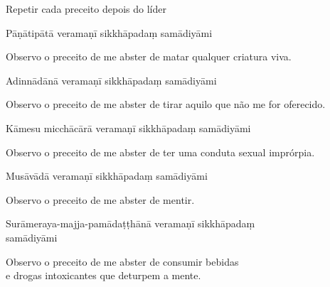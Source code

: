 {\begin{instruction}
  Repetir cada preceito depois do líder
\end{instruction}

\begin{precept}
  \setcounter{enumi}{0}
  \item Pāṇātipātā veramaṇī sikkhāpadaṃ samādiyāmi
\end{precept}

\begin{english}
  Observo o preceito de me abster de matar qualquer criatura viva.
\end{english}

\begin{precept}
  \setcounter{enumi}{1}
  \item Adinnādānā veramaṇī sikkhāpadaṃ samādiyāmi
\end{precept}

\begin{english}
  Observo o preceito de me abster de tirar aquilo que não me for oferecido.
\end{english}

\begin{precept}
  \setcounter{enumi}{2}
  \item Kāmesu micchācārā veramaṇī sikkhāpadaṃ samādiyāmi
\end{precept}

\begin{english}
  Observo o preceito de me abster de ter uma conduta sexual imprórpia.
\end{english}

\begin{precept}
  \setcounter{enumi}{3}
  \item Musāvādā veramaṇī sikkhāpadaṃ samādiyāmi
\end{precept}

\begin{english}
  Observo o preceito de me abster de mentir.
\end{english}

\begin{precept}
  \setcounter{enumi}{4}
  \item Surāmeraya-majja-pamādaṭṭhānā veramaṇī sikkhāpadaṃ\\ samādiyāmi
\end{precept}

\begin{english}
  Observo o preceito de me abster de consumir bebidas\\
  e drogas intoxicantes que deturpem a mente.
\end{english}

}
